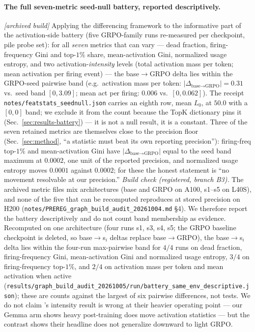 \documentclass{article}
\begin{document}
\paragraph{The full seven-metric seed-null battery, reported descriptively.} \emph{[archived build]} Applying the differencing framework to the informative part of the activation-side battery (five GRPO-family runs re-measured per checkpoint, pile probe set): for all \emph{seven} metrics that can vary --- dead fraction, firing-frequency Gini and top-$1\%$ share, mean-activation Gini, normalized usage entropy, and two activation-\emph{intensity} levels (total activation mass per token; mean activation per firing event) --- the base$\to$GRPO delta lies within the GRPO-seed pairwise band (e.g.\ activation mass per token: $|\Delta_{\text{base}\to\text{GRPO}}|=0.31$ vs.\ seed band $[0,3.09]$; mean act per firing: $0.006$ vs.\ $[0,0.062]$). The receipt \texttt{notes/featstats\_seednull.json} carries an eighth row, mean $L_0$, at $50.0$ with a $[0,0]$ band; we exclude it from the count because the TopK dictionary pins it (Sec.~\ref{sec:results-battery}) --- it is not a null result, it is a constant. Three of the seven retained metrics are themselves close to the precision floor (Sec.~\ref{sec:method}, ``a statistic must beat its own reporting precision''): firing-freq top-$1\%$ and mean-activation Gini have $|\Delta_{\text{base}\to\text{GRPO}}|$ equal to the seed band maximum at $0.0002$, one unit of the reported precision, and normalized usage entropy moves $0.0001$ against $0.0002$; for these the honest statement is ``no movement resolvable at our precision.'' \emph{Build check (registered, branch B3).} The archived metric files mix architectures (base and GRPO on A100, s1--s5 on L40S), and none of the five that can be recomputed reproduces at stored precision on H200 (\texttt{notes/PREREG\_graph\_build\_audit\_20261004.md} \S4). We therefore report the battery descriptively and do not count band membership as evidence. Recomputed on one architecture (four runs s1, s3, s4, s5; the GRPO baseline checkpoint is deleted, so base$\to$s$_i$ deltas replace base$\to$GRPO), the base$\to$s$_i$ delta lies within the four-run max-pairwise band for $4/4$ runs on dead fraction, firing-frequency Gini, mean-activation Gini and normalized usage entropy, $3/4$ on firing-frequency top-$1\%$, and $2/4$ on activation mass per token and mean activation when active (\texttt{results/graph\_build\_audit\_20261005/run/battery\_same\_env\_descriptive.json}); these are counts against the largest of six pairwise differences, not tests. We do not claim \citet{rl_circuit_intensity2026}'s intensity result is wrong at their heavier operating point --- our Gemma arm shows heavy post-training does move activation statistics --- but the contrast shows their headline does not generalize downward to light GRPO.
\end{document}
